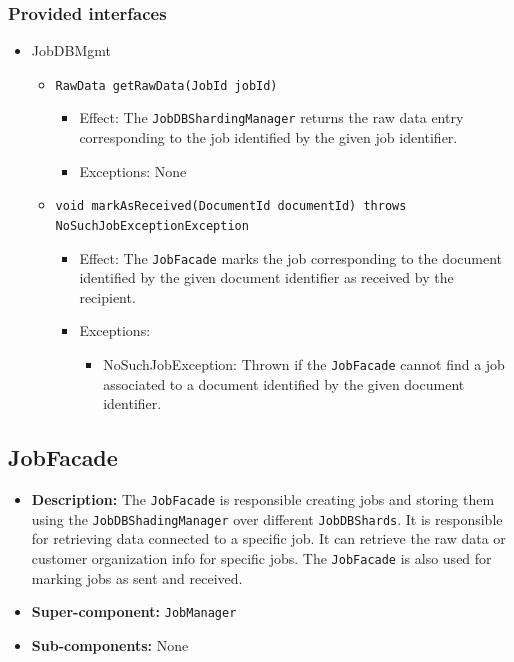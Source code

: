 \documentclass[a4paper,10pt]{article}
\begin{document}
\subsubsection*{Provided interfaces}
\begin{itemize}
    \item JobDBMgmt
    \begin{itemize}
	    \item \texttt{RawData getRawData(JobId jobId)}
        \begin{itemize}
            \item Effect: The \texttt{JobDBShardingManager} returns the raw data entry corresponding to the job identified by the given job identifier.
            \item Exceptions: None
        \end{itemize}    

     	\item \texttt{void markAsReceived(DocumentId documentId) throws NoSuchJobExceptionException}
    	\begin{itemize}
    		\item Effect: The \texttt{JobFacade} marks the job corresponding to the document identified by the given document identifier as received by the recipient.
    		\item Exceptions:
    		\begin{itemize}
    			\item NoSuchJobException: Thrown if the \texttt{JobFacade} cannot find a job associated to a document identified by the given document identifier.
    		\end{itemize}
    	\end{itemize}
    \end{itemize}
\end{itemize}


\subsection{JobFacade}
\begin{itemize}
    \item \textbf{Description:} The \texttt{JobFacade} is responsible creating jobs and storing them using the \texttt{JobDBShadingManager} over different \texttt{JobDBShards}. It is responsible for retrieving data connected to a specific job. It can retrieve the raw data or customer organization info for specific jobs. The \texttt{JobFacade} is also used for marking jobs as sent and received.
    \item \textbf{Super-component:} \texttt{JobManager}
    \item \textbf{Sub-components:} None
\end{itemize}
\end{document}
